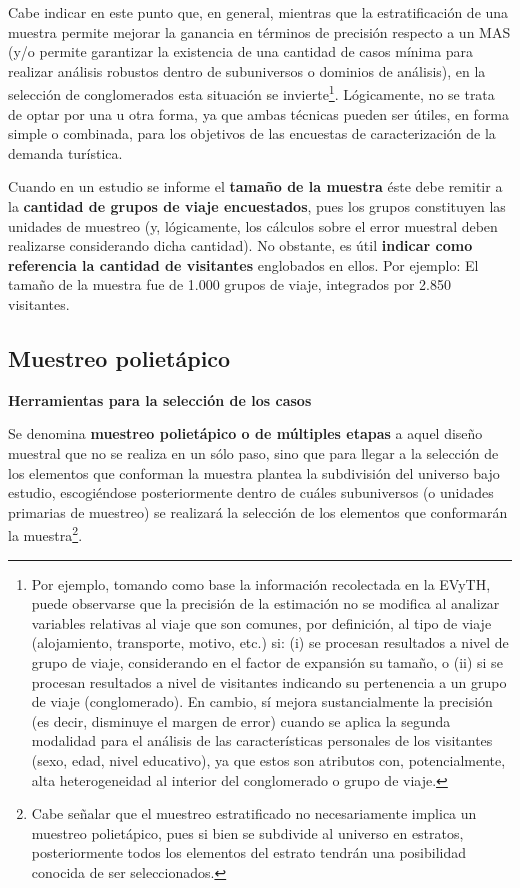 \documentclass[
]{book}
\begin{document}
Cabe indicar en este punto que, en general, mientras que la estratificación de una muestra permite mejorar la ganancia en términos de precisión respecto a un MAS (y/o permite garantizar la existencia de una cantidad de casos mínima para realizar análisis robustos dentro de subuniversos o dominios de análisis), en la selección de conglomerados esta situación se invierte\footnote{Por ejemplo, tomando como base la información recolectada en la EVyTH, puede observarse que la precisión de la estimación no se modifica al analizar variables relativas al viaje que son comunes, por definición, al tipo de viaje (alojamiento, transporte, motivo, etc.) si: (i) se procesan resultados a nivel de grupo de viaje, considerando en el factor de expansión su tamaño, o (ii) si se procesan resultados a nivel de visitantes indicando su pertenencia a un grupo de viaje (conglomerado). En cambio, sí mejora sustancialmente la precisión (es decir, disminuye el margen de error) cuando se aplica la segunda modalidad para el análisis de las características personales de los visitantes (sexo, edad, nivel educativo), ya que estos son atributos con, potencialmente, alta heterogeneidad al interior del conglomerado o grupo de viaje.}. Lógicamente, no se trata de optar por una u otra forma, ya que ambas técnicas pueden ser útiles, en forma simple o combinada, para los objetivos de las encuestas de caracterización de la demanda turística.

Cuando en un estudio se informe el \textbf{tamaño de la muestra} éste debe remitir a la \textbf{cantidad de grupos de viaje encuestados}, pues los grupos constituyen las unidades de muestreo (y, lógicamente, los cálculos sobre el error muestral deben realizarse considerando dicha cantidad). No obstante, es útil \textbf{indicar como referencia la cantidad de visitantes} englobados en ellos. Por ejemplo: El tamaño de la muestra fue de 1.000 grupos de viaje, integrados por 2.850 visitantes.

\hypertarget{muestreo-polietuxe1pico}{%
\subsection{Muestreo polietápico}\label{muestreo-polietuxe1pico}}

\textbf{Herramientas para la selección de los casos}

Se denomina \textbf{muestreo polietápico o de múltiples etapas} a aquel diseño muestral que no se realiza en un sólo paso, sino que para llegar a la selección de los elementos que conforman la muestra plantea la subdivisión del universo bajo estudio, escogiéndose posteriormente dentro de cuáles subuniversos (o unidades primarias de muestreo) se realizará la selección de los elementos que conformarán la muestra\footnote{Cabe señalar que el muestreo estratificado no necesariamente implica un muestreo polietápico, pues si bien se subdivide al universo en estratos, posteriormente todos los elementos del estrato tendrán una posibilidad conocida de ser seleccionados.}.
\end{document}

